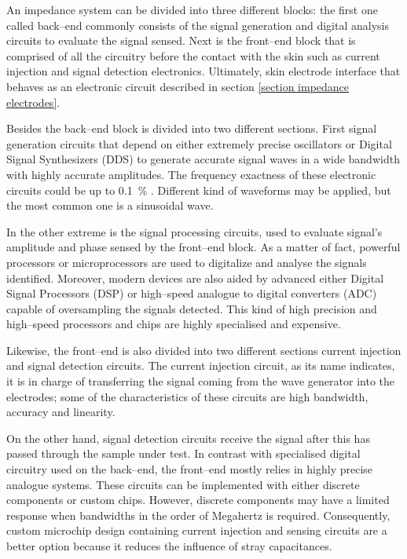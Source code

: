 An impedance system can be divided into three different blocks: the first one called back–end commonly consists of the signal generation and digital analysis circuits to evaluate the signal sensed. Next is the front–end block that is comprised of all the circuitry before the contact with the skin such as current injection and signal detection electronics. Ultimately, skin electrode interface that behaves as an electronic circuit described in section \ref{section impedance electrodes}. 

Besides the back–end block is divided into two different sections. First signal generation circuits that depend on either extremely precise oscillators or Digital Signal Synthesizers (DDS) to generate accurate signal waves in a wide bandwidth with highly accurate amplitudes. The frequency exactness of these electronic circuits could be up to \SI{0.1}{\percent} \cite{ad:AD5930}.  Different kind of waveforms may be applied, but the most common one is a sinusoidal wave. 

In the other extreme is the signal processing circuits, used to evaluate signal’s amplitude and phase sensed by the front–end block.  As a matter of fact, powerful processors or microprocessors are used to digitalize and analyse the signals identified. Moreover, modern devices are also aided by advanced either Digital Signal Processors (DSP) or high–speed analogue to digital converters (ADC) capable of oversampling the signals detected. This kind of high precision and high–speed processors and chips are highly specialised and expensive.

Likewise, the front–end is also divided into two different sections current injection and signal detection circuits. The current injection circuit, as its name indicates, it is in charge of transferring the signal coming from the wave generator into the electrodes; some of the characteristics of these circuits are high bandwidth, accuracy and linearity. 

On the other hand, signal detection circuits receive the signal after this has passed through the sample under test. In contrast with specialised digital circuitry used on the back–end, the front–end mostly relies in highly precise analogue systems. These circuits can be implemented with either discrete components or custom chips. However, discrete components may have a limited response when bandwidths in the order of Megahertz is required. Consequently, custom microchip design containing current injection and sensing circuits are a better option because it reduces the influence of stray capacitances. 

